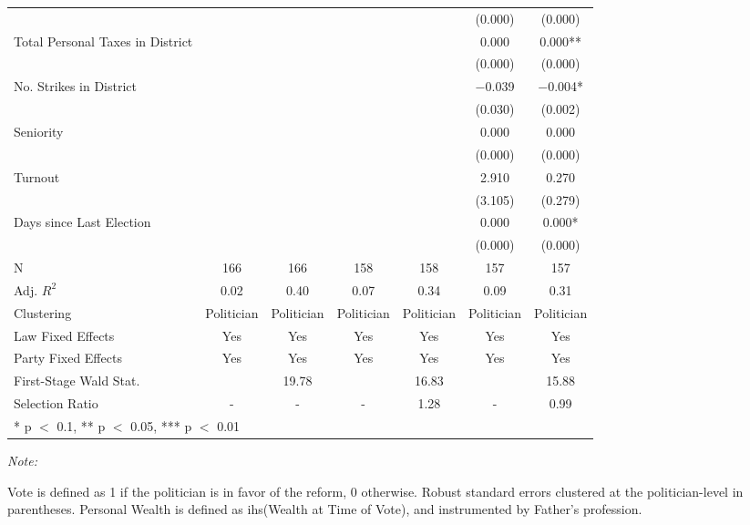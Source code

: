 \begin{table}[!h]
{\begin{threeparttable}
\begin{tabular}[t]{lcccccc}
 &  &  &  &  & (\num{0.000}) & \vphantom{3} (\num{0.000})\\
Total Personal Taxes in District &  &  &  &  & \num{0.000} & \num{0.000}**\\
 &  &  &  &  & (\num{0.000}) & \vphantom{2} (\num{0.000})\\
No. Strikes in District &  &  &  &  & \num{-0.039} & \num{-0.004}*\\
 &  &  &  &  & (\num{0.030}) & (\num{0.002})\\
Seniority &  &  &  &  & \num{0.000} & \num{0.000}\\
 &  &  &  &  & (\num{0.000}) & \vphantom{1} (\num{0.000})\\
Turnout &  &  &  &  & \num{2.910} & \num{0.270}\\
 &  &  &  &  & (\num{3.105}) & (\num{0.279})\\
Days since Last Election &  &  &  &  & \num{0.000} & \num{0.000}*\\
 &  &  &  &  & (\num{0.000}) & (\num{0.000})\\
\midrule
N & \num{166} & \num{166} & \num{158} & \num{158} & \num{157} & \num{157}\\
Adj. $R^2$ & \num{0.02} & \num{0.40} & \num{0.07} & \num{0.34} & \num{0.09} & \num{0.31}\\
Clustering & Politician & Politician & Politician & Politician & Politician & Politician\\
Law Fixed Effects & Yes & Yes & Yes & Yes & Yes & Yes\\
Party Fixed Effects & Yes & Yes & Yes & Yes & Yes & Yes\\
First-Stage Wald Stat. &  & 19.78 &  & 16.83 &  & 15.88\\
Selection Ratio & - & - & - & 1.28 & - & 0.99\\
\bottomrule
\multicolumn{7}{l}{\rule{0pt}{1em}* p $<$ 0.1, ** p $<$ 0.05, *** p $<$ 0.01}\\
\end{tabular}
\begin{tablenotes}[para]
\item \textit{Note: } 
\item Vote is defined as 1 if the politician is in favor of the reform, 0 otherwise. Robust standard errors clustered at the politician-level in parentheses. Personal Wealth is defined as ihs(Wealth at Time of Vote), and instrumented by Father's profession.
\end{tablenotes}
\end{threeparttable}}
\end{table}
